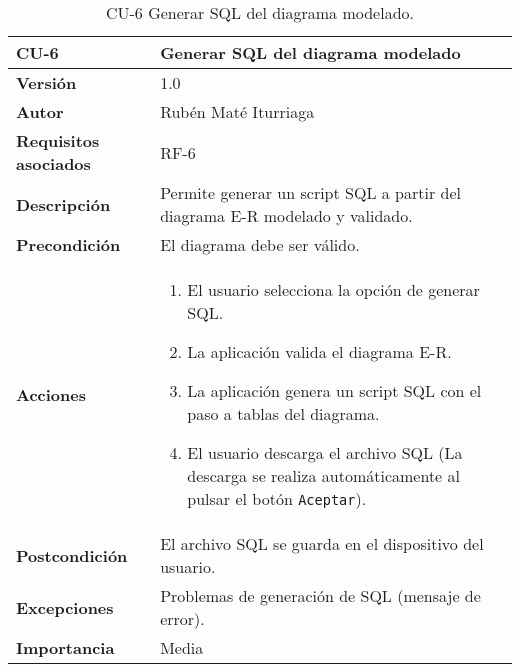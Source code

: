 \begin{table}[p]
	\centering
	\begin{tabularx}{\linewidth}{ p{} p{} }
		\toprule
		\textbf{CU-6}    & \textbf{Generar SQL del diagrama modelado}\\
		\toprule
		\textbf{Versión}              & 1.0    \\
		\textbf{Autor}                & Rubén Maté Iturriaga \\
		\textbf{Requisitos asociados} & RF-6 \\
		\textbf{Descripción}          & Permite generar un script SQL a partir del diagrama E-R modelado y validado. \\
		\textbf{Precondición}         & El diagrama debe ser válido. \\
		\textbf{Acciones}             &
		\begin{enumerate}
			\def\labelenumi{\arabic{enumi}.}
			\tightlist
			\item El usuario selecciona la opción de generar SQL.
			\item La aplicación valida el diagrama E-R.
			\item La aplicación genera un script SQL con el paso a tablas del diagrama.
			\item El usuario descarga el archivo SQL (La descarga se realiza automáticamente al pulsar el botón \texttt{Aceptar}).
		\end{enumerate}\\
		\textbf{Postcondición}        & El archivo SQL se guarda en el dispositivo del usuario. \\
		\textbf{Excepciones}          & Problemas de generación de SQL (mensaje de error). \\
		\textbf{Importancia}          & Media \\
		\bottomrule
	\end{tabularx}
	\caption{CU-6 Generar SQL del diagrama modelado.}
\end{table}

